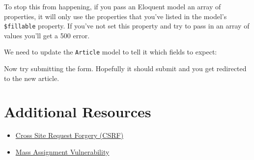 To stop this from happening, if you pass an Eloquent model an array of properties, it will only use the properties that you've listed in the model's \texttt{\$fillable} property. If you've not set this property and try to pass in an array of values you'll get a 500 error.

\pagebreak

We need to update the \texttt{Article} model to tell it which fields to expect:


Now try submitting the form. Hopefully it should submit and you get redirected to the new article.


\section{Additional Resources}

\begin{itemize}[leftmargin=*]
    \item \href{https://owasp.org/www-community/attacks/csrf}{Cross Site Request Forgery (CSRF)}
    \item \href{https://cheatsheetseries.owasp.org/cheatsheets/Mass_Assignment_Cheat_Sheet.html}{Mass Assignment Vulnerability}
\end{itemize}
